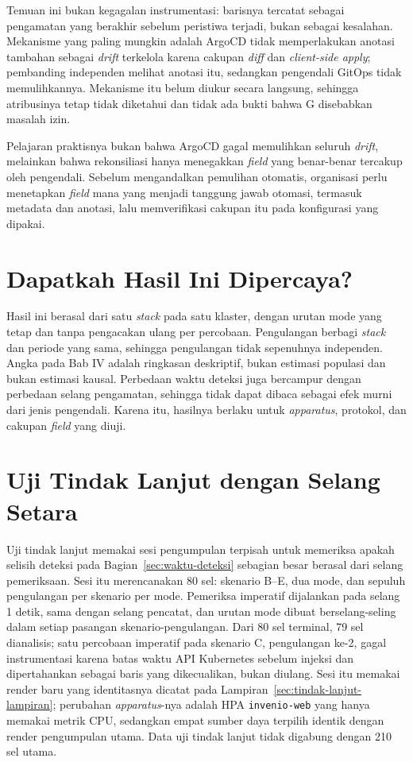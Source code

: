 Temuan ini bukan kegagalan instrumentasi: barisnya tercatat sebagai pengamatan yang berakhir sebelum peristiwa terjadi, bukan sebagai kesalahan. Mekanisme yang paling mungkin adalah ArgoCD tidak memperlakukan anotasi tambahan sebagai \textit{drift} terkelola karena cakupan \textit{diff} dan \textit{client-side apply}; pembanding independen melihat anotasi itu, sedangkan pengendali GitOps tidak memulihkannya. Mekanisme itu belum diukur secara langsung, sehingga atribusinya tetap tidak diketahui dan tidak ada bukti bahwa G disebabkan masalah izin.

Pelajaran praktisnya bukan bahwa ArgoCD gagal memulihkan seluruh \textit{drift}, melainkan bahwa rekonsiliasi hanya menegakkan \textit{field} yang benar-benar tercakup oleh pengendali. Sebelum mengandalkan pemulihan otomatis, organisasi perlu menetapkan \textit{field} mana yang menjadi tanggung jawab otomasi, termasuk metadata dan anotasi, lalu memverifikasi cakupan itu pada konfigurasi yang dipakai.

\section{Dapatkah Hasil Ini Dipercaya?}
\label{sec:batas-kepercayaan}

Hasil ini berasal dari satu \textit{stack} pada satu klaster, dengan urutan mode yang tetap dan tanpa pengacakan ulang per percobaan. Pengulangan berbagi \textit{stack} dan periode yang sama, sehingga pengulangan tidak sepenuhnya independen. Angka pada Bab IV adalah ringkasan deskriptif, bukan estimasi populasi dan bukan estimasi kausal. Perbedaan waktu deteksi juga bercampur dengan perbedaan selang pengamatan, sehingga tidak dapat dibaca sebagai efek murni dari jenis pengendali. Karena itu, hasilnya berlaku untuk \textit{apparatus}, protokol, dan cakupan \textit{field} yang diuji.

\section{Uji Tindak Lanjut dengan Selang Setara}
\label{sec:tindak-lanjut-selang}

Uji tindak lanjut memakai sesi pengumpulan terpisah untuk memeriksa apakah selisih deteksi pada Bagian~\ref{sec:waktu-deteksi} sebagian besar berasal dari selang pemeriksaan. Sesi itu merencanakan 80 sel: skenario B--E, dua mode, dan sepuluh pengulangan per skenario per mode. Pemeriksa imperatif dijalankan pada selang 1 detik, sama dengan selang pencatat, dan urutan mode dibuat berselang-seling dalam setiap pasangan skenario-pengulangan. Dari 80 sel terminal, 79 sel dianalisis; satu percobaan imperatif pada skenario C, pengulangan ke-2, gagal instrumentasi karena batas waktu API Kubernetes sebelum injeksi dan dipertahankan sebagai baris yang dikecualikan, bukan diulang. Sesi itu memakai render baru yang identitasnya dicatat pada Lampiran~\ref{sec:tindak-lanjut-lampiran}; perubahan \textit{apparatus}-nya adalah HPA \texttt{invenio-web} yang hanya memakai metrik CPU, sedangkan empat sumber daya terpilih identik dengan render pengumpulan utama. Data uji tindak lanjut tidak digabung dengan 210 sel utama.

